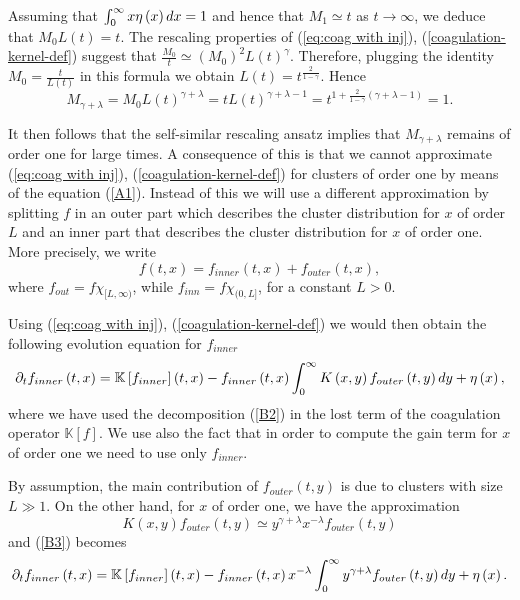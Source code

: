 \documentclass[11pt]{article}
\numberwithin{equation}{section}
\theoremstyle{plain}
\newcommand{\der}{\textup{d}}
\begin{document}
Assuming that $\int_{0}^{\infty}%
x\eta\left(  x\right) \der x=1$ and hence that $M_{1}\simeq t$ as $t\rightarrow\infty$, we deduce that $M_{0}L(t)=t$. 
The rescaling properties of
(\ref{eq:coag with inj}), (\ref{coagulation-kernel-def}) suggest that $\frac{M_{0}}{t}%
\simeq\left(  M_{0}\right)^{2}L(t)^{\gamma}.$ Therefore, plugging the
identity $M_{0}=\frac{t}{L(t)}$ in this formula we obtain $L(t)=
t^{\frac{2}{1-\gamma}}.$ Hence
\begin{equation} \label{scaling argument}
M_{\gamma+\lambda}=M_{0}L(t)^{\gamma+\lambda}=tL(t)^{\gamma+\lambda-1}=  t^{1+\frac
{2}{1-\gamma}\left(  \gamma+\lambda-1\right)  }=1. 
\end{equation} 


It then follows that the self-similar rescaling ansatz implies that
$M_{\gamma+\lambda}$ remains of order one for large times. A consequence of
this is that we cannot approximate (\ref{eq:coag with inj}), (\ref{coagulation-kernel-def})
for clusters of order one by means of the equation (\ref{A1}). Instead of this
we will use a different approximation by splitting $f$ in an outer part which
describes the cluster distribution for $x$ of order $L$ and an inner part
that describes the cluster distribution for $x$ of order one. More precisely,
we write%
\begin{equation}
f\left(t,x\right)  =f_{inner}\left( t, x \right)  +f_{outer}\left(
t, x\right),  \label{B2}%
\end{equation}
where $f_{out} = f \chi_{[L, \infty ) }$, while $f_{inn} =f \chi_{(0, L] }$, for a constant $L>0.$

Using (\ref{eq:coag with inj}), (\ref{coagulation-kernel-def}) we would then obtain the
following evolution equation for $f_{inner}$ 
\begin{equation}
\partial_{t}f_{inner}\left(  t,x\right)  =\mathbb{K}\left[  f_{inner}\right]
\left(  t,x\right)  -f_{inner}\left(  t,x\right)  \int_{0}^{\infty}K\left(
x,y\right)  f_{outer}\left(  t,y\right)  \der y+\eta\left(  x\right),  \label{B3}%
\end{equation}
where we have used the decomposition (\ref{B2}) in the lost term of the
coagulation operator $\mathbb{K}\left[  f\right]  $. We use also the fact that
in order to compute the gain term for $x$ of order one we need to use only
$f_{inner}.$

By assumption, the main contribution of $f_{outer}\left(  t,y\right)  $ is due
to clusters with size $L \gg1.$ On the other hand, for $x$ of order one, we have the
approximation%
\[
K\left(  x,y\right)  f_{outer}\left(  t,y\right)  \simeq y^{\gamma+\lambda
}x^{-\lambda}f_{outer}\left(  t,y\right)
\]
and (\ref{B3}) becomes%
\begin{equation}
\partial_{t}f_{inner}\left(  t,x\right)  =\mathbb{K}\left[  f_{inner}\right]
\left(  t,x\right)  -f_{inner}\left(  t,x\right)  x^{-\lambda}\int_{0}%
^{\infty}y^{\gamma+\lambda}f_{outer}\left(  t,y\right) \der y+\eta\left(
x\right).  \label{B4}%
\end{equation}
\end{document}
